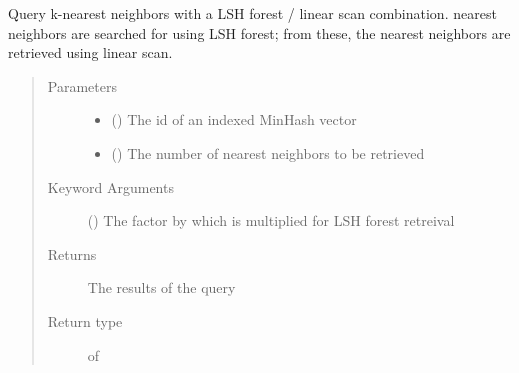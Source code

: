 \documentclass[letterpaper,10pt,english]{sphinxmanual}
\begin{document}
\begin{fulllineitems}
\begin{fulllineitems}
\begin{quote}
\begin{description}
\end{description}\end{quote}

\end{fulllineitems}


\begin{fulllineitems}
\label{\detokenize{documentation:tmap.LSHForest.query_linear_scan_by_id}}
Query k-nearest neighbors with a LSH forest / linear scan combination.  nearest neighbors are searched for using LSH forest; from these, the  nearest neighbors are retrieved using linear scan.
\begin{quote}\begin{description}
\item[{Parameters}] \leavevmode\begin{itemize}
\item {} 
 () \textendash{} The id of an indexed MinHash vector

\item {} 
 () \textendash{} The number of nearest neighbors to be retrieved

\end{itemize}

\item[{Keyword Arguments}] \leavevmode
{} () \textendash{} The factor by which  is multiplied for LSH forest retreival

\item[{Returns}] \leavevmode
The results of the query

\item[{Return type}] \leavevmode
{} of 

\end{description}\end{quote}


\end{fulllineitems}
\end{fulllineitems}
\end{document}
